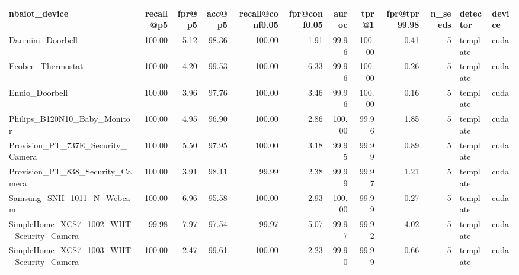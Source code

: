 \begin{tabular}{lrrrrrrrrrll}
\toprule
nbaiot\_device & recall@p5 & fpr@p5 & acc@p5 & recall@conf0.05 & fpr@conf0.05 & auroc & tpr@1 & fpr@tpr99.98 & n\_seeds & detector & device \\
\midrule
Danmini\_Doorbell & 100.00 & 5.12 & 98.36 & 100.00 & 1.91 & 99.96 & 100.00 & 0.41 & 5 & template & cuda \\
Ecobee\_Thermostat & 100.00 & 4.20 & 99.53 & 100.00 & 6.33 & 99.96 & 100.00 & 0.26 & 5 & template & cuda \\
Ennio\_Doorbell & 100.00 & 3.96 & 97.76 & 100.00 & 3.46 & 99.96 & 100.00 & 0.16 & 5 & template & cuda \\
Philips\_B120N10\_Baby\_Monitor & 100.00 & 4.95 & 96.90 & 100.00 & 2.86 & 100.00 & 99.96 & 1.85 & 5 & template & cuda \\
Provision\_PT\_737E\_Security\_Camera & 100.00 & 5.50 & 97.95 & 100.00 & 3.18 & 99.95 & 99.99 & 0.89 & 5 & template & cuda \\
Provision\_PT\_838\_Security\_Camera & 100.00 & 3.91 & 98.11 & 99.99 & 2.38 & 99.99 & 99.97 & 1.21 & 5 & template & cuda \\
Samsung\_SNH\_1011\_N\_Webcam & 100.00 & 6.96 & 95.58 & 100.00 & 2.93 & 100.00 & 99.99 & 0.27 & 5 & template & cuda \\
SimpleHome\_XCS7\_1002\_WHT\_Security\_Camera & 99.98 & 7.97 & 97.54 & 99.97 & 5.07 & 99.97 & 99.92 & 4.02 & 5 & template & cuda \\
SimpleHome\_XCS7\_1003\_WHT\_Security\_Camera & 100.00 & 2.47 & 99.61 & 100.00 & 2.23 & 99.90 & 99.99 & 0.66 & 5 & template & cuda \\
\bottomrule
\end{tabular}
